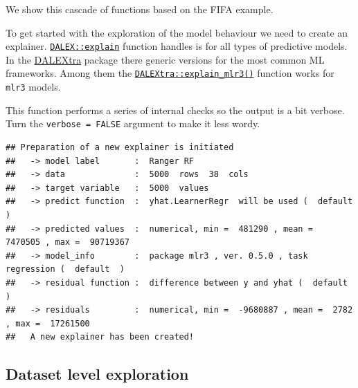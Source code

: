 \documentclass[]{scrbook}
\newenvironment{Shaded}{\begin{snugshade}}{\end{snugshade}}
\newcommand{\DataTypeTok}[1]{\textcolor[rgb]{0.13,0.29,0.53}{#1}}
\newcommand{\KeywordTok}[1]{\textcolor[rgb]{0.13,0.29,0.53}{\textbf{#1}}}
\newcommand{\NormalTok}[1]{#1}
\newcommand{\OperatorTok}[1]{\textcolor[rgb]{0.81,0.36,0.00}{\textbf{#1}}}
\newcommand{\OtherTok}[1]{\textcolor[rgb]{0.56,0.35,0.01}{#1}}
\newcommand{\StringTok}[1]{\textcolor[rgb]{0.31,0.60,0.02}{#1}}
\renewenvironment{Shaded} {\begin{snugshade}\small} {\end{snugshade}}
\begin{document}
We show this cascade of functions based on the FIFA example.

To get started with the exploration of the model behaviour we need to create an explainer. \href{https://www.rdocumentation.org/packages/DALEX/topics/explain}{\texttt{DALEX::explain}} function handles is for all types of predictive models. In the \href{https://cran.r-project.org/package=DALEXtra}{DALEXtra} package there generic versions for the most common ML frameworks. Among them the \href{https://www.rdocumentation.org/packages/DALEXtra/topics/explain_mlr3}{\texttt{DALEXtra::explain\_mlr3()}} function works for \texttt{mlr3} models.

This function performs a series of internal checks so the output is a bit verbose. Turn the \texttt{verbose\ =\ FALSE} argument to make it less wordy.

\begin{Shaded}
\end{Shaded}

\begin{verbatim}
## Preparation of a new explainer is initiated
##   -> model label       :  Ranger RF 
##   -> data              :  5000  rows  38  cols 
##   -> target variable   :  5000  values 
##   -> predict function  :  yhat.LearnerRegr  will be used (  default  )
##   -> predicted values  :  numerical, min =  481290 , mean =  7470505 , max =  90719367  
##   -> model_info        :  package mlr3 , ver. 0.5.0 , task regression (  default  ) 
##   -> residual function :  difference between y and yhat (  default  )
##   -> residuals         :  numerical, min =  -9680887 , mean =  2782 , max =  17261500  
##   A new explainer has been created!
\end{verbatim}

\hypertarget{interpretability-dataset-level}{%
\subsection{Dataset level exploration}\label{interpretability-dataset-level}}
\end{document}
